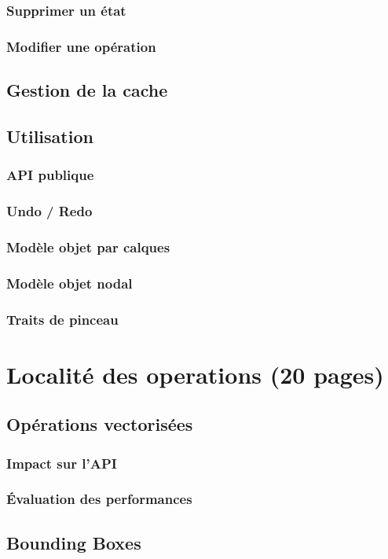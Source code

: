 		\subsection{Supprimer un état}
		\subsection{Modifier une opération}
	\section{Gestion de la cache}
	\section{Utilisation}
		\subsection{API publique}
		\subsection{Undo / Redo}
		\subsection{Modèle objet par calques}
		\subsection{Modèle objet nodal}
		\subsection{Traits de pinceau}

\chapter{Localité des operations (20 pages)}
	\section{Opérations vectorisées}
		\subsection{Impact sur l'API}
		\subsection{Évaluation des performances}
	\section{Bounding Boxes}
